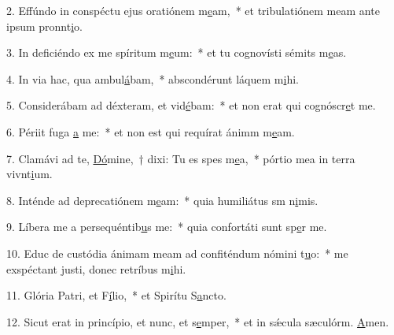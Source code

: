 2. Effúndo in conspéctu ejus oratiónem m\uline{e}am,~* et tribulatiónem meam ante ipsum pronnt\uline{i}o.\par 
3. In deficiéndo ex me spíritum m\uline{e}um:~* et tu cognovísti sémits m\uline{e}as.\par 
4. In via hac, qua ambul\uline{á}bam,~* abscondérunt láquem m\uline{i}hi.\par 
5. Considerábam ad déxteram, et vid\uline{é}bam:~* et non erat qui cognóscr\uline{e}t me.\par 
6. Périit fuga \uline{a} me:~* et non est qui requírat ánimm m\uline{e}am.\par 
7. Clamávi ad te, \uline{Dó}mine,~† dixi: Tu es spes m\uline{e}a,~* pórtio mea in terra vivnt\uline{i}um.\par 
8. Inténde ad deprecatiónem m\uline{e}am:~* quia humiliátus sm n\uline{i}mis.\par 
9. Líbera me a persequéntib\uline{u}s me:~* quia confortáti sunt sp\uline{e}r me.\par 
10. Educ de custódia ánimam meam ad confiténdum nómini t\uline{u}o:~* me exspéctant justi, donec retríbus m\uline{i}hi.\par 
11. Glória Patri, et F\uline{í}lio,~* et Spirítu S\uline{a}ncto.\par 
12. Sicut erat in princípio, et nunc, et s\uline{e}mper,~* et in sǽcula sæculórm. \uline{A}men.\par 
